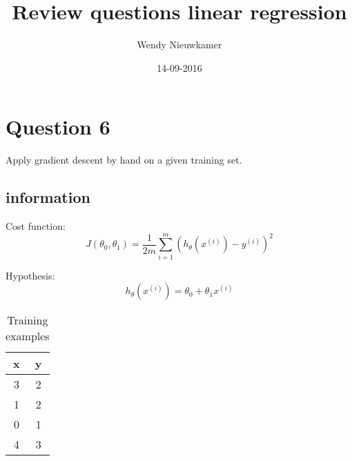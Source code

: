 \documentclass{article}
\title{Review questions linear regression}
\date{14-09-2016}
\author{Wendy Nieuwkamer}
\begin{document}
\section{Question 6}
Apply gradient descent by hand on a given training set.
\subsection{information}

Cost function:
\begin{equation}
J(\theta _0 , \theta _1 ) = \frac{1}{2m} \sum_{i=1}^{m}(h_{\theta}(x^{(i)})-y^{(i)})^{2}
\end{equation}

Hypothesis:
\begin{equation}
h_{\theta}(x^{(i)}) = \theta _0 + \theta _1 x^{(i)}
\end{equation}

\begin{table}[h!]
  \centering
  \caption{Training examples}
  \label{tab:table1}
  \begin{tabular}{cc}
    \toprule
    x & y \\
    \midrule
    3&2\\
    1&2\\
    0&1\\
    4&3\\
    \bottomrule
  \end{tabular}
\end{table}
\end{document}
